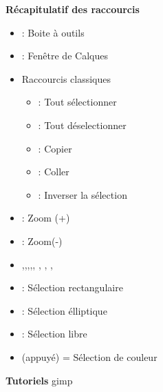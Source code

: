 \documentclass[10pt,svgnames,usenames,table]{beamer}
\begin{document}
\begin{frame}
	\textbf{Récapitulatif des raccourcis}
	\begin{itemize}
	\item {} : Boite à outils
	\item {} : Fenêtre de Calques
	\item Raccourcis classiques 
	\begin{itemize}
	 \item {} : Tout sélectionner
	 \item {} : Tout déselectionner
	 \item {} : Copier
	 \item {} : Coller
	 \item {} : Inverser la sélection
	\end{itemize}
	\item \keys{{+}} : Zoom (+)
	\item \keys{-} : Zoom(-)
	\item {},,,,, , , ,   
	\item {} : Sélection rectangulaire 
	\item {} : Sélection élliptique 
	\item {} : Sélection libre
	\item {} (appuyé) = Sélection de couleur
	\end{itemize}
	
	\begin{center}
	\end{center}
\end{frame}

\begin{frame}
	\textbf{Tutoriels} gimp 
\end{frame}

\end{document}
